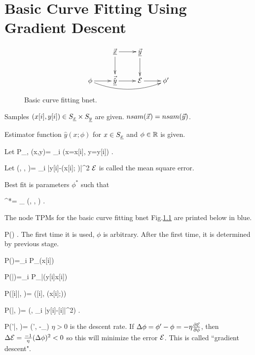 \chapter{Basic Curve Fitting
Using Gradient Descent}
\label{ch-basic-fit}

\begin{figure}[h!]
\centering
$$\xymatrix{
&\vec{\rvx}\ar[d]\ar[r]&\ul{\vecy}
\ar[d]&\\
\phi\ar[r]\ar@/_1pc/[rrr]&
\vec{\hat{\rvy}}\ar[r]&\cale\ar[r]&\phi'
}$$
\caption{Basic curve fitting bnet.}
\label{fig-bfit}
\end{figure}


Samples 
$(x[i], y[i])\in S_{\underline{x}}\times S_{\underline{y}}$
are given. $nsam({\vec{x}})=nsam({\vec{y}})$.

Estimator function 
$\hat{y}(x; \phi)$
for $x\in S_{\underline{x}}$ and $\phi\in{ \mathbb{R}}$
is given.

Let 
\beq
P_{\rvx, \rvy}(x,y)=
\sum_i \indi(x=x[i], y=y[i])
\;.
\eeq


Let 
\beq
\cale(\vecx, \vecy, \phi)=
\sum_i
|y[i]-(x[i]; \phi)|^2
\;
\eeq
${\cal E}$ is called the mean square error.

Best fit is parameters $\phi^*$
such that

\beq 
\phi^*= \argmin_\phi
\cale(\vecx, \vecy, \phi)
\;.
\eeq

The node TPMs for
the basic curve fitting bnet
 Fig.\ref{fig-bfit} are
printed below in blue.

\beq\color{blue}
P(\phi) 
\;.
\eeq
The first time
it is used, $\phi$ is arbitrary.
After the first time, it is determined 
by previous stage.

\beq\color{blue}
P(\vecx)=\prod_i P_\rvx(x[i])
\eeq

\beq\color{blue}
P(\vecy|\vecx)=\prod_i P_{\rvy|\rvx}(y[i]\cond x[i])
\eeq

\beq\color{blue}
P([i]|\phi, \vecx)=
\delta([i], (x[i];\phi))
\eeq


\beq\color{blue}
P(\cale|, \vecy)=
\delta(\cale,
\sum_i |y[i]-[i]|^2)
\;.
\eeq


\beq\color{blue}
P(\phi'|\phi, \cale)=
\delta(\phi',
\phi-\eta\partial_\phi\cale)
\eeq
$\eta>0$ is the descent rate.
If $\Delta \phi=\phi'-\phi=-\eta 
\frac{\partial{\cal E}}
{\partial \phi}$, then
 $\Delta {\cal E}=\frac{-1}{\eta}
(\Delta\phi)^2<0$  so this will
minimize the error
${\cal E}$.
This is called ``gradient descent".